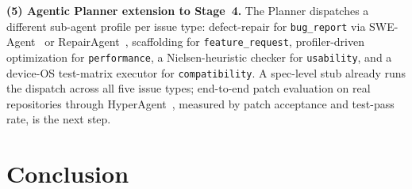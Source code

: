 \documentclass[sigconf, anonymous]{acmart}
\begin{document}
\textbf{(5) Agentic Planner extension to Stage~4.} The Planner dispatches a different
  sub-agent profile per issue type: defect-repair for \texttt{bug\_report} via
  SWE-Agent~\cite{yang2024swe} or RepairAgent~\cite{bouzenia2025repairagent}, scaffolding
  for \texttt{feature\_request}, profiler-driven optimization for \texttt{performance}, a
  Nielsen-heuristic checker for \texttt{usability}, and a device-OS test-matrix executor for
  \texttt{compatibility}. A spec-level stub already runs the dispatch across all five issue
  types; end-to-end patch evaluation on real repositories through
  HyperAgent~\cite{phan2024hyperagent}, measured by patch acceptance and test-pass rate, is the
  next step.

\section{Conclusion}\label{conclusion}
\end{document}
